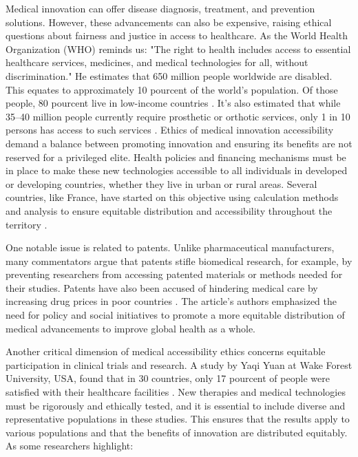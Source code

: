 Medical innovation can offer disease diagnosis, treatment, and prevention solutions. However, these advancements can also be expensive, raising ethical questions about fairness and justice in access to healthcare. As the World Health Organization (WHO) reminds us: "The right to health includes access to essential healthcare services, medicines, and medical technologies for all, without discrimination." He estimates that 650 million people worldwide are disabled. This equates to approximately 10 pourcent of the world’s population. Of those people, 80 pourcent live in low-income countries \cite{eide_assistive_2009}\cite{noauthor_provision_nodate}. It’s also estimated that while 35–40 million people currently require prosthetic or orthotic services, only 1 in 10 persons has access to such services \cite{noauthor_exploring_nodate}. Ethics of medical innovation accessibility demand a balance between promoting innovation and ensuring its benefits are not reserved for a privileged elite. Health policies and financing mechanisms must be in place to make these new technologies accessible to all individuals in developed or developing countries, whether they live in urban or rural areas. Several countries, like France, have started on this objective using calculation methods and analysis to ensure equitable distribution and accessibility throughout the territory \cite{noauthor_lindicateur_nodate}.

One notable issue is related to patents. Unlike pharmaceutical manufacturers, many commentators argue that patents stifle biomedical research, for example, by preventing researchers from accessing patented materials or methods needed for their studies. Patents have also been accused of hindering medical care by increasing drug prices in poor countries \cite{noauthor_are_nodate}. The article's authors emphasized the need for policy and social initiatives to promote a more equitable distribution of medical advancements to improve global health as a whole.

Another critical dimension of medical accessibility ethics concerns equitable participation in clinical trials and research. A study by Yaqi Yuan at Wake Forest University, USA, found that in 30 countries, only 17 pourcent of people were satisfied with their healthcare facilities \cite{noauthor_public_nodate}. New therapies and medical technologies must be rigorously and ethically tested, and it is essential to include diverse and representative populations in these studies. This ensures that the results apply to various populations and that the benefits of innovation are distributed equitably. As some researchers highlight:

